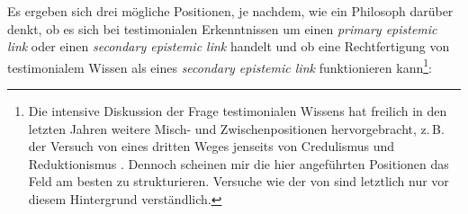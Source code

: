 Es ergeben sich drei mögliche Positionen, je nachdem, wie ein Philosoph darüber
denkt, ob es sich bei testimonialen Erkenntnissen um einen \emph{primary
epistemic link} oder einen \emph{secondary epistemic link} handelt und ob eine
Rechtfertigung von testimonialem Wissen als eines \emph{secondary epistemic
link} funktionieren kann\footnote{Die intensive Diskussion der Frage
testimonialen Wissens hat freilich in den letzten Jahren weitere Misch- und
Zwischenpositionen hervorgebracht, z.\,B. der Versuch von
 eines dritten Weges jenseits
von Credulismus und Reduktionismus
\parencite[vgl.][]{Lackey:ItTakesTwotoTango2006}. Dennoch scheinen mir die hier
angeführten  Positionen das Feld am besten zu
strukturieren. Versuche wie der von 
sind letztlich nur vor diesem Hintergrund verständlich.}:
